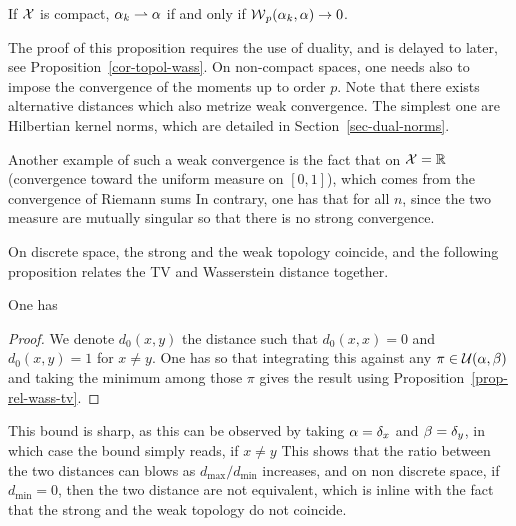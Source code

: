 \begin{prop}
	If $\mathcal{X}$ is compact, $\alpha_k \rightharpoonup \alpha$ if and only if $\operatorname{\mathcal{W}}_p(\alpha_k,\alpha) \rightarrow 0$. 
\end{prop}

The proof of this proposition requires the use of duality, and is delayed to later, see Proposition~\ref{cor-topol-wass}. 
On non-compact spaces, one needs also to impose the convergence of the moments up to order $p$.
%
Note that there exists alternative distances which also metrize weak convergence. The simplest one are Hilbertian kernel norms, which are detailed in Section~\ref{sec-dual-norms}.

Another example of such a weak convergence is the fact that on $\mathcal{X}=\mathbb{R}$
(convergence toward the uniform measure on $[0,1]$), which comes from the convergence of Riemann sums 
In contrary, one has that for all $n$, since the two measure are mutually singular
so that there is no strong convergence.

On discrete space, the strong and the weak topology coincide, and the following proposition relates the TV and Wasserstein distance together. 

\begin{prop}
	One has
\end{prop}

\begin{proof}
	We denote $d_0(x,y)$ the distance such that $d_0(x,x)=0$ and $d_0(x,y)=1$ for $x \neq y$. One has 
	so that integrating this against any $\pi \in \mathcal{U}(\alpha,\beta)$ and taking the minimum among those $\pi$ gives the result using Proposition~\eqref{prop-rel-wass-tv}. 
\end{proof}

This bound is sharp, as this can be observed by taking $\alpha=\delta_{x}$ and $\beta=\delta_y$, in which case the bound simply reads, if $x \neq y$
%
This shows that the ratio between the two distances can blows as $d_{\max}/d_{\min}$ increases, and on non discrete space, if $d_{\min}=0$, then the two distance are not equivalent, which is inline with the fact that the strong and the weak topology do not coincide. 



